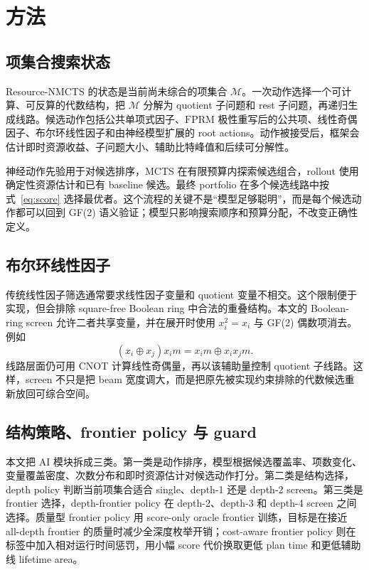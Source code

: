 \documentclass[UTF8,fontset=macnew,11pt]{ctexart}
\newcommand{\method}{Resource-NMCTS}
\newcommand{\fprm}{\ensuremath{\mathrm{FPRM}}}
\newcommand{\mcts}{\ensuremath{\mathrm{MCTS}}}
\newcommand{\xor}{\ensuremath{\oplus}}
\begin{document}
\section{方法}

\subsection{项集合搜索状态}

\method{} 的状态是当前尚未综合的项集合 $\mathcal{M}$。一次动作选择一个可计算、可反算的代数结构，把 $\mathcal{M}$ 分解为 quotient 子问题和 rest 子问题，再递归生成线路。候选动作包括公共单项式因子、\fprm{} 极性重写后的公共项、线性奇偶因子、布尔环线性因子和由神经模型扩展的 root actions。动作被接受后，框架会估计即时资源收益、子问题大小、辅助比特峰值和后续可分解性。

神经动作先验用于对候选排序，\mcts{} 在有限预算内探索候选组合，rollout 使用确定性资源估计和已有 baseline 候选。最终 portfolio 在多个候选线路中按式~\eqref{eq:score} 选择最优者。这个流程的关键不是“模型足够聪明”，而是每个候选动作都可以回到 GF(2) 语义验证；模型只影响搜索顺序和预算分配，不改变正确性定义。

\subsection{布尔环线性因子}

传统线性因子筛选通常要求线性因子变量和 quotient 变量不相交。这个限制便于实现，但会排除 square-free Boolean ring 中合法的重叠结构。本文的 Boolean-ring screen 允许二者共享变量，并在展开时使用 $x_i^2=x_i$ 与 GF(2) 偶数项消去。例如
\begin{equation}
  (x_i\xor x_j)x_i m = x_i m \xor x_i x_j m .
  \label{eq:boolean-ring}
\end{equation}
线路层面仍可用 CNOT 计算线性奇偶量，再以该辅助量控制 quotient 子线路。这样，screen 不只是把 beam 宽度调大，而是把原先被实现约束排除的代数候选重新放回可综合空间。

\subsection{结构策略、frontier policy 与 guard}

本文把 AI 模块拆成三类。第一类是动作排序，模型根据候选覆盖率、项数变化、变量覆盖密度、次数分布和即时资源估计对候选动作打分。第二类是结构选择，depth policy 判断当前项集合适合 single、depth-1 还是 depth-2 screen。第三类是 frontier 选择，depth-frontier policy 在 depth-2、depth-3 和 depth-4 screen 之间选择。质量型 frontier policy 用 score-only oracle frontier 训练，目标是在接近 all-depth frontier 的质量时减少全深度枚举开销；cost-aware frontier policy 则在标签中加入相对运行时间惩罚，用小幅 score 代价换取更低 plan time 和更低辅助线 lifetime area。
\end{document}
